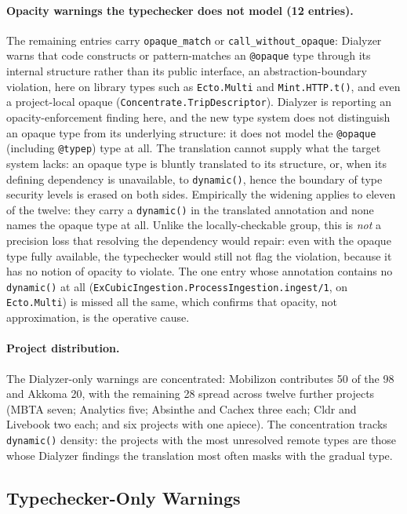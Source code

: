 \paragraph{Opacity warnings the typechecker does not model (12 entries).}
The remaining entries carry \texttt{opaque\_match} or \texttt{call\_without\_opaque}: Dialyzer warns that code constructs or pattern-matches an \texttt{@opaque} type through its internal structure rather than its public interface, an abstraction-boundary violation, here on library types such as \texttt{Ecto.Multi} and \texttt{Mint.HTTP.t()}, and even a project-local opaque (\texttt{Concentrate.TripDescriptor}).
Dialyzer is reporting an opacity-enforcement finding here, and the new type system does not distinguish an opaque type from its underlying structure: it does not model the \texttt{@opaque} (including \texttt{@typep}) type at all.
The translation cannot supply what the target system lacks: an opaque type is bluntly translated to its structure, or, when its defining dependency is unavailable, to \texttt{dynamic()}, hence the boundary of type security levels is erased on both sides.
Empirically the widening applies to eleven of the twelve: they carry a \texttt{dynamic()} in the translated annotation and none names the opaque type at all.
Unlike the locally-checkable group, this is \emph{not} a precision loss that resolving the dependency would repair: even with the opaque type fully available, the typechecker would still not flag the violation, because it has no notion of opacity to violate.
The one entry whose annotation contains no \texttt{dynamic()} at all (\texttt{ExCubicIngestion.ProcessIngestion.ingest/1}, on \texttt{Ecto.Multi}) is missed all the same, which confirms that opacity, not approximation, is the operative cause.

\paragraph{Project distribution.}
The Dialyzer-only warnings are concentrated: Mobilizon contributes 50 of the 98 and Akkoma 20, with the remaining 28 spread across twelve further projects (MBTA seven; Analytics five; Absinthe and Cachex three each; Cldr and Livebook two each; and six projects with one apiece).
The concentration tracks \texttt{dynamic()} density: the projects with the most unresolved remote types are those whose Dialyzer findings the translation most often masks with the gradual type.

\subsection{Typechecker-Only Warnings}
\label{sec:typecheck-only}

